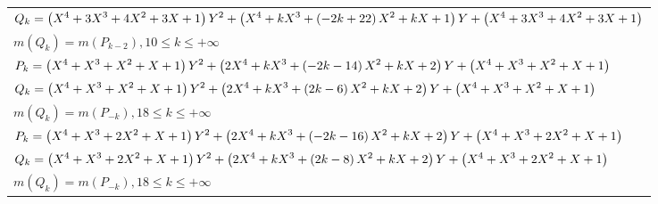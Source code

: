 \documentclass{amsart}
\begin{document}
\begin{longtable}{|l|}
\(\displaystyle Q_k= \left(X^4
 + 3\*X^3
 + 4\*X^2
 + 3\*X
 + 1\right) \*Y^2
 + \left(X^4
 + k\*X^3
 + \left(-2\*k
 + 22\right) \*X^2
 + k\*X
 + 1\right) \*Y
 + \left(X^4
 + 3\*X^3
 + 4\*X^2
 + 3\*X
 + 1\right) \)\\
\(\displaystyle m(Q_k) = m(P_{k
 - 2}),10 \leqslant k \leqslant +\infty\)\\
\hline
\(\displaystyle P_k= \left(X^4
 + X^3
 + X^2
 + X
 + 1\right) \*Y^2
 + \left(2\*X^4
 + k\*X^3
 + \left(-2\*k
 - 14\right) \*X^2
 + k\*X
 + 2\right) \*Y
 + \left(X^4
 + X^3
 + X^2
 + X
 + 1\right) \)\\
\(\displaystyle Q_k= \left(X^4
 + X^3
 + X^2
 + X
 + 1\right) \*Y^2
 + \left(2\*X^4
 + k\*X^3
 + \left(2\*k
 - 6\right) \*X^2
 + k\*X
 + 2\right) \*Y
 + \left(X^4
 + X^3
 + X^2
 + X
 + 1\right) \)\\
\(\displaystyle m(Q_k) = m(P_{-k}),18 \leqslant k \leqslant +\infty\)\\
\hline
\(\displaystyle P_k= \left(X^4
 + X^3
 + 2\*X^2
 + X
 + 1\right) \*Y^2
 + \left(2\*X^4
 + k\*X^3
 + \left(-2\*k
 - 16\right) \*X^2
 + k\*X
 + 2\right) \*Y
 + \left(X^4
 + X^3
 + 2\*X^2
 + X
 + 1\right) \)\\
\(\displaystyle Q_k= \left(X^4
 + X^3
 + 2\*X^2
 + X
 + 1\right) \*Y^2
 + \left(2\*X^4
 + k\*X^3
 + \left(2\*k
 - 8\right) \*X^2
 + k\*X
 + 2\right) \*Y
 + \left(X^4
 + X^3
 + 2\*X^2
 + X
 + 1\right) \)\\
\(\displaystyle m(Q_k) = m(P_{-k}),18 \leqslant k \leqslant +\infty\)\\
\hline
\end{longtable}



\fontsize{10}{10}\selectfont
\end{document}
